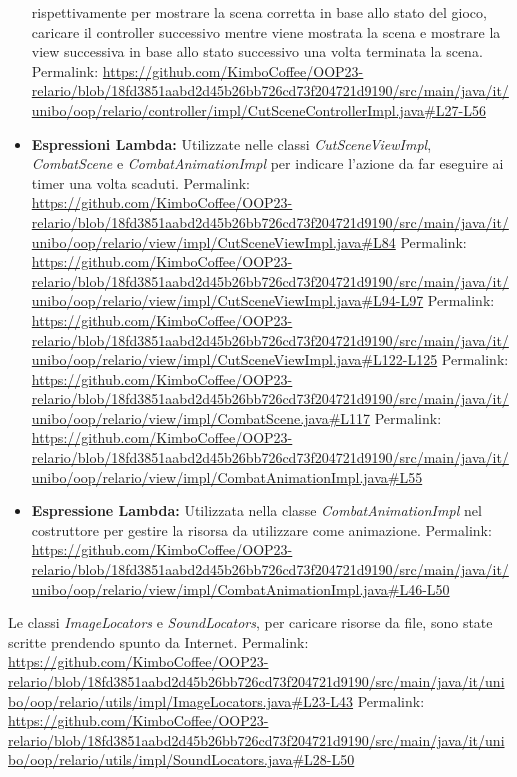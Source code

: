 \documentclass[a4paper,12pt]{report}
\begin{document}
\begin{itemize}
	rispettivamente per mostrare la scena corretta in base allo stato del gioco, caricare il controller successivo mentre viene mostrata la scena e mostrare la view successiva in
	base allo stato successivo una volta terminata la scena.
	Permalink: \url{https://github.com/KimboCoffee/OOP23-relario/blob/18fd3851aabd2d45b26bb726cd73f204721d9190/src/main/java/it/unibo/oop/relario/controller/impl/CutSceneControllerImpl.java#L27-L56}
	\item \textbf{Espressioni Lambda:} Utilizzate nelle classi \textit{CutSceneViewImpl}, \textit{CombatScene} e \textit{CombatAnimationImpl} per indicare l'azione da far eseguire ai timer una volta scaduti.
	Permalink: \url{https://github.com/KimboCoffee/OOP23-relario/blob/18fd3851aabd2d45b26bb726cd73f204721d9190/src/main/java/it/unibo/oop/relario/view/impl/CutSceneViewImpl.java#L84}
	Permalink: \url{https://github.com/KimboCoffee/OOP23-relario/blob/18fd3851aabd2d45b26bb726cd73f204721d9190/src/main/java/it/unibo/oop/relario/view/impl/CutSceneViewImpl.java#L94-L97}
	Permalink: \url{https://github.com/KimboCoffee/OOP23-relario/blob/18fd3851aabd2d45b26bb726cd73f204721d9190/src/main/java/it/unibo/oop/relario/view/impl/CutSceneViewImpl.java#L122-L125}
	Permalink: \url{https://github.com/KimboCoffee/OOP23-relario/blob/18fd3851aabd2d45b26bb726cd73f204721d9190/src/main/java/it/unibo/oop/relario/view/impl/CombatScene.java#L117}
	Permalink: \url{https://github.com/KimboCoffee/OOP23-relario/blob/18fd3851aabd2d45b26bb726cd73f204721d9190/src/main/java/it/unibo/oop/relario/view/impl/CombatAnimationImpl.java#L55}
	\item \textbf{Espressione Lambda:} Utilizzata nella classe \textit{CombatAnimationImpl} nel costruttore per gestire la risorsa da utilizzare come animazione.
	Permalink: \url{https://github.com/KimboCoffee/OOP23-relario/blob/18fd3851aabd2d45b26bb726cd73f204721d9190/src/main/java/it/unibo/oop/relario/view/impl/CombatAnimationImpl.java#L46-L50}
\end{itemize}

Le classi \textit{ImageLocators} e \textit{SoundLocators}, per caricare risorse da file, sono state scritte prendendo spunto da Internet.
Permalink: \url{https://github.com/KimboCoffee/OOP23-relario/blob/18fd3851aabd2d45b26bb726cd73f204721d9190/src/main/java/it/unibo/oop/relario/utils/impl/ImageLocators.java#L23-L43}
Permalink: \url{https://github.com/KimboCoffee/OOP23-relario/blob/18fd3851aabd2d45b26bb726cd73f204721d9190/src/main/java/it/unibo/oop/relario/utils/impl/SoundLocators.java#L28-L50}
\end{document}
